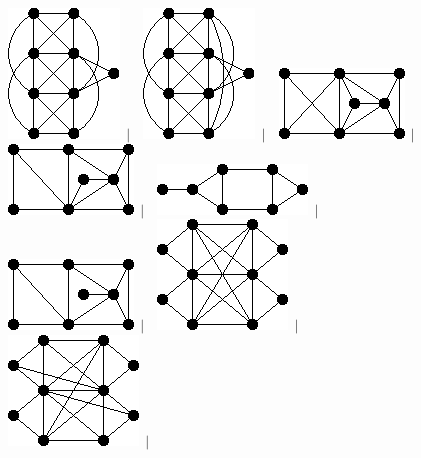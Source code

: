 \documentclass[11pt,paper=b5,footinclude,headinclude]{scrbook} %
\newtheorem{ex}{Vaja\hypertarget{sol:\theex}}[chapter]
\begin{document}
\begin{ex}
\begin{figure}
\includegraphics[scale=0.5]{smallGraphs/g_co-X140.png}$\,\mid\,$\
\includegraphics[scale=0.5]{smallGraphs/g_co-X141.png}$\,\mid\,$\
\includegraphics[scale=0.5]{smallGraphs/g_co-X142.png}$\,\mid\,$\
\includegraphics[scale=0.5]{smallGraphs/g_co-X146.png}$\,\mid\,$\
\includegraphics[scale=0.5]{smallGraphs/g_co-X15.png}$\,\mid\,$\
\includegraphics[scale=0.5]{smallGraphs/g_co-X151.png}$\,\mid\,$\
\includegraphics[scale=0.5]{smallGraphs/g_co-X155.png}$\,\mid\,$\
\includegraphics[scale=0.5]{smallGraphs/g_co-X158.png}$\,\mid\,$\

\end{figure}
\end{ex}
\end{document}
